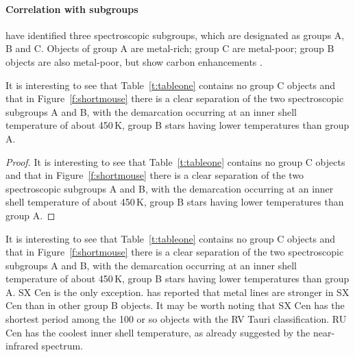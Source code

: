 \documentclass[useAMS,usenatbib, referree]{biom}
\begin{document}
\paragraph{Correlation with subgroups}%
\citet{b20} have identified three spectroscopic subgroups, which
are designated as groups A, B and C. Objects of group A are
metal-rich; group C are metal-poor; group B objects are also
metal-poor, but  show carbon enhancements \citep{b20,b14,b4,b1}.\vspace*{-6pt}
\begin{theorem}
It is interesting to see that Table~\ref{t:tableone} contains no group
C objects and that in Figure~\ref{f:shortmouse} there is a clear
separation of the two spectroscopic subgroups A and B, with the
demarcation occurring at an inner shell temperature of about 450$\,$K,
group B stars having lower temperatures than group A.
\end{theorem}
\begin{proof}
It is interesting to see that Table~\ref{t:tableone} contains no group
C objects and that in Figure~\ref{f:shortmouse} there is a clear
separation of the two spectroscopic subgroups A and B, with the
demarcation occurring at an inner shell temperature of about 450$\,$K,
group B stars having lower temperatures than group A.
\end{proof}
It is interesting to see that Table~\ref{t:tableone} contains no group
C objects and that in Figure~\ref{f:shortmouse} there is a clear
separation of the two spectroscopic subgroups A and B, with the
demarcation occurring at an inner shell temperature of about 450$\,$K,
group B stars having lower temperatures than group A. SX Cen is the
only exception. \citet{b14} has reported that metal lines are stronger
in SX Cen than in other group B objects. It may be worth noting that
SX Cen has the shortest period among the 100 or so objects with the RV
Tauri classification. RU Cen has the coolest inner shell temperature,
as already suggested by the near-infrared spectrum\break \citep{b6}.
\end{document}
